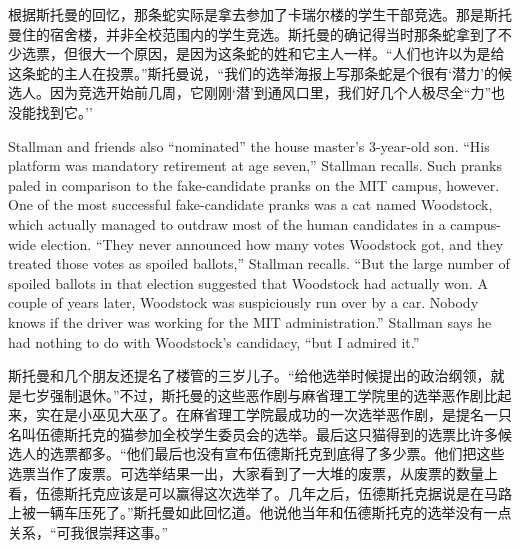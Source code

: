 \ifdefined\chs
根据斯托曼的回忆，那条蛇实际是拿去参加了卡瑞尔楼的学生干部竞选。那是斯托曼住的宿舍楼，并非全校范围内的学生竞选。斯托曼的确记得当时那条蛇拿到了不少选票，但很大一个原因，是因为这条蛇的姓和它主人一样。``人们也许以为是给这条蛇的主人在投票。''斯托曼说，``我们的选举海报上写那条蛇是个很有`潜力'的候选人。因为竞选开始前几周，它刚刚`潜'到通风口里，我们好几个人极尽全``力''也没能找到它。''
\fi

\ifdefined\eng
Stallman and friends also ``nominated'' the house master's 3-year-old son. ``His platform was mandatory retirement at age seven,'' Stallman recalls. Such pranks paled in comparison to the fake-candidate pranks on the MIT campus, however. One of the most successful fake-candidate pranks was a cat named Woodstock, which actually managed to outdraw most of the human candidates in a campus-wide election. ``They never announced how many votes Woodstock got, and they treated those votes as spoiled ballots,'' Stallman recalls. ``But the large number of spoiled ballots in that election suggested that Woodstock had actually won. A couple of years later, Woodstock was suspiciously run over by a car. Nobody knows if the driver was working for the MIT administration.'' Stallman says he had nothing to do with Woodstock's candidacy, ``but I admired it.''
\fi

\ifdefined\chs
斯托曼和几个朋友还提名了楼管的三岁儿子。``给他选举时候提出的政治纲领，就是七岁强制退休。''不过，斯托曼的这些恶作剧与麻省理工学院里的选举恶作剧比起来，实在是小巫见大巫了。在麻省理工学院最成功的一次选举恶作剧，是提名一只名叫伍德斯托克的猫参加全校学生委员会的选举。最后这只猫得到的选票比许多候选人的选票都多。``他们最后也没有宣布伍德斯托克到底得了多少票。他们把这些选票当作了废票。可选举结果一出，大家看到了一大堆的废票，从废票的数量上看，伍德斯托克应该是可以赢得这次选举了。几年之后，伍德斯托克据说是在马路上被一辆车压死了。''斯托曼如此回忆道。他说他当年和伍德斯托克的选举没有一点关系，``可我很崇拜这事。''
\fi

